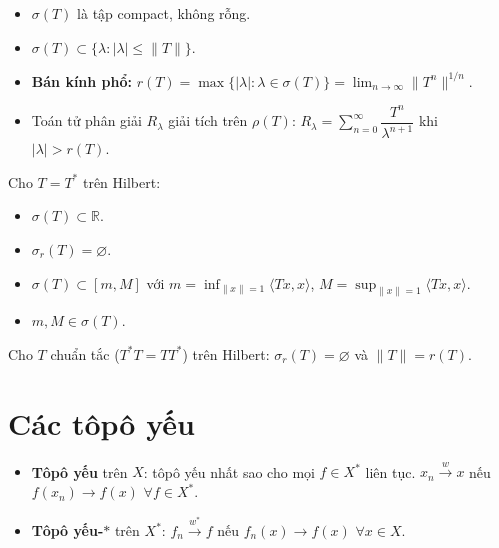\documentclass[12pt,a4paper]{article}
\begin{document}
\begin{tinhchat}
  \begin{itemize}
    \item $\sigma(T)$ là tập compact, không rỗng.
    \item $\sigma(T) \subset \{\lambda : |\lambda| \le \|T\|\}$.
    \item \textbf{Bán kính phổ:} $r(T) = \max\{|\lambda| : \lambda \in \sigma(T)\} = \displaystyle\lim_{n \to \infty} \|T^n\|^{1/n}$.
    \item Toán tử phân giải $R_\lambda$ giải tích trên $\rho(T)$: $R_\lambda = \sum_{n=0}^{\infty} \dfrac{T^n}{\lambda^{n+1}}$ khi $|\lambda| > r(T)$.
  \end{itemize}
\end{tinhchat}

\begin{dinhly}[title={Phổ toán tử tự liên hợp}]
  Cho $T = T^*$ trên Hilbert:
  \begin{itemize}
    \item $\sigma(T) \subset \mathbb{R}$.
    \item $\sigma_r(T) = \varnothing$.
    \item $\sigma(T) \subset [m, M]$ với $m = \inf_{\|x\|=1}\langle Tx, x \rangle$, $M = \sup_{\|x\|=1}\langle Tx, x \rangle$.
    \item $m, M \in \sigma(T)$.
  \end{itemize}
\end{dinhly}

\begin{dinhly}[title={Phổ toán tử chuẩn tắc}]
  Cho $T$ chuẩn tắc ($T^*T = TT^*$) trên Hilbert: $\sigma_r(T) = \varnothing$ và $\|T\| = r(T)$.
\end{dinhly}

\section{Các tôpô yếu}

\begin{dinhnghia}
  \begin{itemize}
    \item \textbf{Tôpô yếu} trên $X$: tôpô yếu nhất sao cho mọi $f \in X^*$ liên tục. $x_n \xrightarrow{w} x$ nếu $f(x_n) \to f(x)$ $\forall f \in X^*$.
    \item \textbf{Tôpô yếu-$*$} trên $X^*$: $f_n \xrightarrow{w^*} f$ nếu $f_n(x) \to f(x)$ $\forall x \in X$.
  \end{itemize}
\end{dinhnghia}
\end{document}
